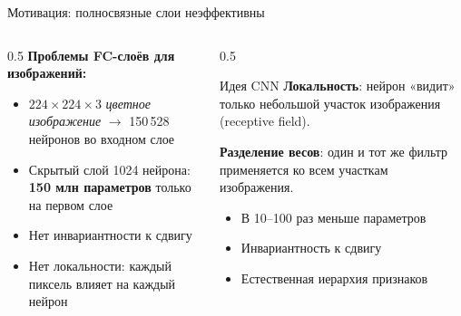 \documentclass[aspectratio=169, 9pt]{beamer}
\begin{document}
\begin{frame}{Мотивация: полносвязные слои неэффективны}
  \begin{columns}[T]
    \begin{column}{0.5\textwidth}
      \textbf{Проблемы FC-слоёв для изображений:}
      \begin{itemize}
        \item $224\times224\times3$ \textit{цветное изображение} $\to$ 150\,528 нейронов во входном слое
        \item Скрытый слой 1024 нейрона: \textbf{150 млн параметров} только на первом слое
        \item Нет инвариантности к сдвигу
        \item Нет локальности: каждый пиксель влияет на каждый нейрон
      \end{itemize}
    \end{column}
    \begin{column}{0.5\textwidth}
      \begin{block}{Идея CNN}
        \textbf{Локальность}: нейрон «видит» только небольшой участок изображения (receptive field).
        
        \textbf{Разделение весов}: один и тот же фильтр применяется ко всем участкам изображения.
        
        \begin{itemize}
          \item В 10--100 раз меньше параметров
          \item Инвариантность к сдвигу
          \item Естественная иерархия признаков
        \end{itemize}
      \end{block}
    \end{column}
  \end{columns}
\end{frame}
\end{document}
